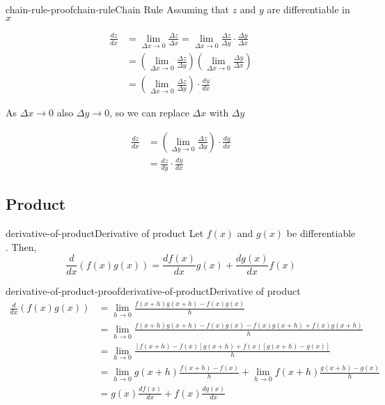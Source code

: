 \documentclass[preview]{standalone}
\begin{document}
\begin{snippetproof}{chain-rule-proof}{chain-rule}{Chain Rule}
    Assuming that \(z\) and \(y\) are differentiable in \(x\)
    
    \begin{align*}
        \frac{dz}{dx}
        &= \lim_{\Delta x \to 0} \frac{\Delta z}{\Delta x}
        = \lim_{\Delta x \to 0} \frac{\Delta z}{\Delta y} \cdot \frac{\Delta y}{\Delta x} \\
        &= \left(
            \lim_{\Delta x \to 0} \frac{\Delta z}{\Delta y}
        \right)
        \left(
            \lim_{\Delta x \to 0} \frac{\Delta y}{\Delta x}
        \right) \\
        &= \left(
            \lim_{\Delta x \to 0} \frac{\Delta z}{\Delta y}
        \right)
        \cdot
        \frac{dy}{dx}
    \end{align*}
    
    As \(\Delta x \to 0\) also \(\Delta y \to 0\), so we can replace \(\Delta x\) with \(\Delta y\)
    
    \begin{align*}
        \frac{dz}{dx}
        &= \left(
            \lim_{\Delta y \to 0} \frac{\Delta z}{\Delta y}
        \right)
        \cdot
        \frac{dy}{dx} \\
        &= \frac{dz}{dy} \cdot \frac{dy}{dx}
    \end{align*}
\end{snippetproof}

\subsection{Product}

\begin{snippetproposition}{derivative-of-product}{Derivative of product}
    Let \(f(x)\) and \(g(x)\) be differentiable \function[functions].
    Then, \[
        \frac{d}{dx}\left(f(x)g(x)\right) =\frac{df(x)}{dx}g(x) + \frac{dg(x)}{dx}f(x)
    \]
\end{snippetproposition}

\begin{snippetproof}{derivative-of-product-proof}{derivative-of-product}{Derivative of product}
    \begin{align*}
        \frac{d}{dx}\left(f(x)g(x)\right) &= \lim_{h \to 0}
        \frac{f(x+h)g(x+h) - f(x)g(x)}{h} \\
        &= \lim_{h \to 0} \frac{f(x+h)g(x+h) - f(x)g(x) -f(x)g(x+h) + f(x)g(x+h)}{h} \\
        &= \lim_{h \to 0} \frac{[f(x+h)-f(x)]g(x+h) + f(x)[g(x+h)-g(x)]}{h} \\
        &= \lim_{h \to 0} g(x+h)\frac{f(x+h)-f(x)}{h} + \lim_{h \to 0} f(x+h)\frac{g(x+h)-g(x)}{h} \\
        &= g(x) \frac{df(x)}{dx} + f(x) \frac{dg(x)}{dx}
    \end{align*}
\end{snippetproof}
\end{document}
